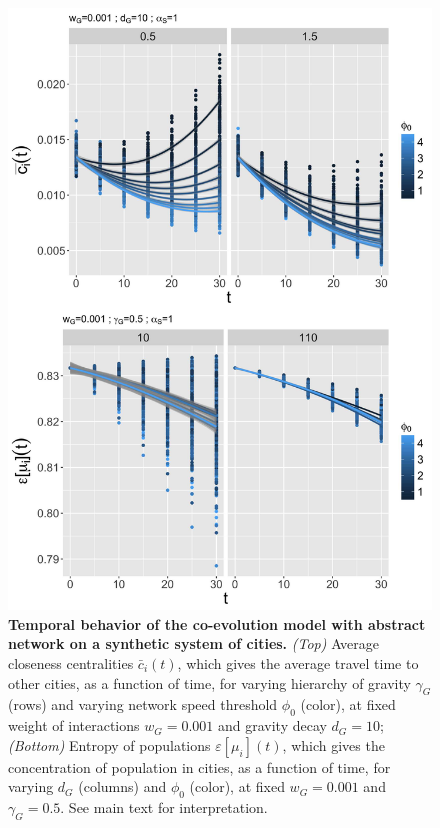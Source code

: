 \documentclass[11pt]{article}
\begin{document}
\begin{figure}
\includegraphics[width=\linewidth,height=0.9\textheight]{figures/Fig2.jpg}
\caption{\textbf{Temporal behavior of the co-evolution model with abstract network on a synthetic system of cities.} \textit{(Top)} Average closeness centralities $\bar{c}_i(t)$, which gives the average travel time to other cities, as a function of time, for varying hierarchy of gravity $\gamma_G$ (rows) and varying network speed threshold $\phi_0$ (color), at fixed weight of interactions $w_G = 0.001$ and gravity decay $d_G = 10$; \textit{(Bottom)} Entropy of populations $\varepsilon\left[\mu_i \right] (t)$, which gives the concentration of population in cities, as a function of time, for varying $d_G$ (columns) and $\phi_0$ (color), at fixed $w_G = 0.001$ and $\gamma_G = 0.5$. See main text for interpretation.\label{fig:macrocoevol:behavior-time}}
\end{figure}
\end{document}
